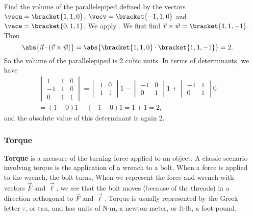 \begin{example}\label{ex_crossp6}%
Find the volume of the parallelepiped defined by the vectors $\vecu = \bracket{1,1,0}$, $\vecv = \bracket{-1,1,0}$ and $\vecw = \bracket{0,1,1}$.
\solution
We apply . We first find $\vec v\times\vec w =\bracket{1,1,-1}$. Then
\[\abs{\vec u\cdot(\vec v\times\vec w)} = \abs{\bracket{1,1,0}\cdot \bracket{1,1,-1}} = 2.\]
So the volume of the parallelepiped is 2 cubic units.  In terms of determinants, we have
\begin{multline*}
 \begin{vmatrix}1&1&0\\ -1&1&0\\0&1&1\end{vmatrix}
 =\begin{vmatrix}1&0\\1&1\end{vmatrix}1
 -\begin{vmatrix}-1&0\\0&1\end{vmatrix}1
 +\begin{vmatrix}-1&1\\0&1\end{vmatrix}0\\
 =(1-0)1-(-1-0)1
 =1+1
 =2,
\end{multline*}
and the absolute value of this determinant is again 2.
\end{example}


\subsubsection{Torque}

\textbf{Torque} is a measure of the turning force applied to an object. A classic scenario involving torque is the application of a wrench to a bolt. When a force is applied to the wrench, the bolt turns. When we represent the force and wrench with vectors $\vec F$ and $\vec \ell$, we see that the bolt moves (because of the threads) in a  direction orthogonal to $\vec F$ and $\vec \ell$. Torque is usually represented by the Greek letter $\tau$, or tau, and has units of N$\cdot$m, a newton-meter, or ft$\cdot$lb, a foot-pound.

